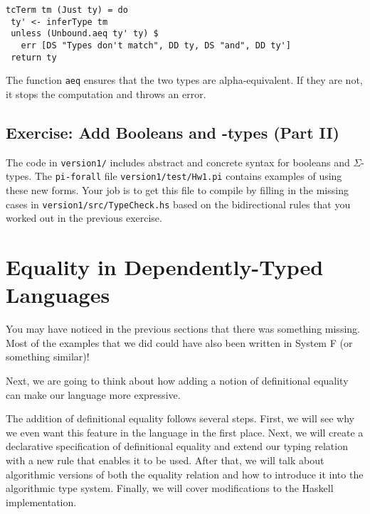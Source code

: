 \documentclass{article}
\def\({}%
\def\){}%
\newcommand\pif{\texttt{pi-forall}\xspace}
\theoremstyle{definition}
\begin{document}
\begin{verbatim}
tcTerm tm (Just ty) = do
 ty' <- inferType tm
 unless (Unbound.aeq ty' ty) $
   err [DS "Types don't match", DD ty, DS "and", DD ty']
 return ty
\end{verbatim}

The function \texttt{aeq} ensures that the two types are alpha-equivalent. If
they are not, it stops the computation and throws an error.



\subsection{Exercise:  Add Booleans and
\(\Sigma\)-types (Part II)}

The code in \texttt{version1/} includes abstract and
concrete syntax for booleans and $\Sigma$-types. The \pif file
\texttt{version1/test/Hw1.pi} contains examples of using these new forms. Your
job is to get this file to compile by filling in the missing cases in
\texttt{version1/src/TypeCheck.hs} based on the bidirectional rules that you
worked out in the previous exercise.

\section{Equality in Dependently-Typed Languages}
\label{sec:equality}

You may have noticed in the previous sections that there was something
missing. Most of the examples that we did could have also been written in
System F (or something similar)!

Next, we are going to think about how adding a notion of definitional equality
can make our language more expressive.

The addition of definitional equality follows several steps. First, we will see why we even want this feature in the language in the first place. Next, we will create a declarative specification of definitional equality and extend our typing relation with
a new rule that enables it to be used. After that, we will talk about algorithmic versions of both the equality relation and how to introduce it into the algorithmic type system.
Finally, we will cover modifications to the Haskell implementation.
\end{document}
